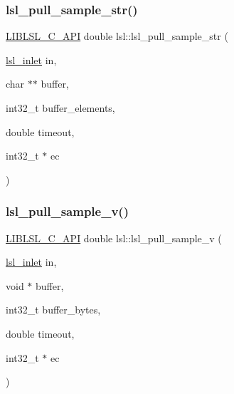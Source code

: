 \mbox{\label{namespacelsl_a3fd4085148eab55ea6a918dc151869a3}} 
\subsubsection{\texorpdfstring{lsl\+\_\+pull\+\_\+sample\+\_\+str()}{lsl\_pull\_sample\_str()}}
{\footnotesize\ttfamily \hyperlink{lsl__cpp_8h_aafd0ef1813e8be84a1420c4f1df64615}{L\+I\+B\+L\+S\+L\+\_\+\+C\+\_\+\+A\+PI} double lsl\+::lsl\+\_\+pull\+\_\+sample\+\_\+str (\begin{DoxyParamCaption}\item[{\hyperlink{namespacelsl_a884a3363cfcba75d7ce8f00c1c4c54f1}{lsl\+\_\+inlet}}]{in,  }\item[{char $\ast$$\ast$}]{buffer,  }\item[{int32\+\_\+t}]{buffer\+\_\+elements,  }\item[{double}]{timeout,  }\item[{int32\+\_\+t $\ast$}]{ec }\end{DoxyParamCaption})}

\mbox{\label{namespacelsl_a4b9141b42af68f2224c1f72044bf6018}} 
\subsubsection{\texorpdfstring{lsl\+\_\+pull\+\_\+sample\+\_\+v()}{lsl\_pull\_sample\_v()}}
{\footnotesize\ttfamily \hyperlink{lsl__cpp_8h_aafd0ef1813e8be84a1420c4f1df64615}{L\+I\+B\+L\+S\+L\+\_\+\+C\+\_\+\+A\+PI} double lsl\+::lsl\+\_\+pull\+\_\+sample\+\_\+v (\begin{DoxyParamCaption}\item[{\hyperlink{namespacelsl_a884a3363cfcba75d7ce8f00c1c4c54f1}{lsl\+\_\+inlet}}]{in,  }\item[{void $\ast$}]{buffer,  }\item[{int32\+\_\+t}]{buffer\+\_\+bytes,  }\item[{double}]{timeout,  }\item[{int32\+\_\+t $\ast$}]{ec }\end{DoxyParamCaption})}

